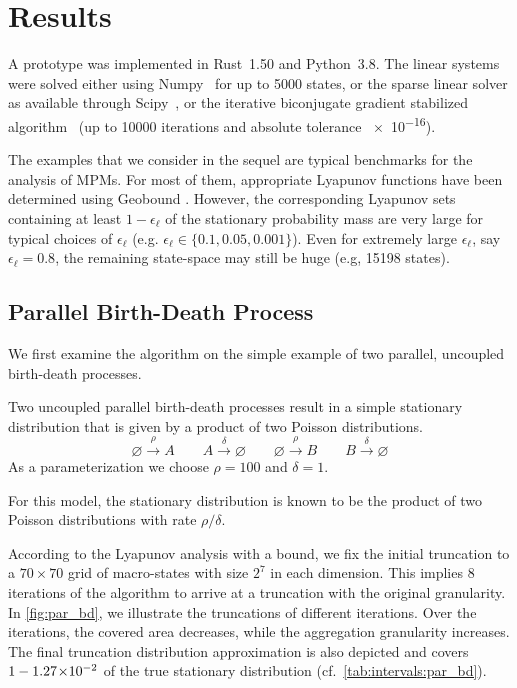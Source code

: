 \section{Results}\label{sec:statagg:results}
A prototype was implemented in Rust~1.50 and Python~3.8.
The linear systems were solved either using Numpy~\cite{numpy} for up to \num{5000} states, or the sparse linear solver as available through Scipy~\cite{2020SciPy-NMeth}, or the iterative biconjugate gradient stabilized algorithm~\cite{van1992bi} (up to \num{10000} iterations and absolute tolerance \num{e-16}).

The examples that we consider in the sequel 
are typical benchmarks for the analysis of \acp{MPM}. For most of them, appropriate Lyapunov functions
have been determined using Geobound \cite{geobound,spieler2014numerical}.
However, the corresponding Lyapunov sets containing at least $1-\epsilon_{\ell}$ of the stationary probability mass are very large for typical choices of $\epsilon_{\ell}$ (e.g. $\epsilon_{\ell}\in \{0.1,0.05,0.001\}$). Even
for extremely large $\epsilon_{\ell}$, say $\epsilon_{\ell}=0.8$, the remaining state-space may still be huge (e.g, \num{15198} states).
\subsection{Parallel Birth-Death Process}
We first examine the algorithm on the simple example of two parallel, uncoupled birth-death processes.
\begin{model}\label{model:par_bd}
Two uncoupled parallel birth-death processes result in a simple stationary distribution that is
given by a product of two Poisson distributions.
$$\varnothing\xrightarrow{\rho} A \qquad A\xrightarrow{\delta} \varnothing \qquad
\varnothing\xrightarrow{\rho} B \qquad B\xrightarrow{\delta} \varnothing$$
As a parameterization we choose $\rho = 100$ and $\delta=1$.
\end{model}
For this model, the stationary distribution is known to be the product of two Poisson distributions with rate $\rho / \delta$.

According to the Lyapunov analysis with a  bound, we fix the initial truncation to a $70\times 70$ grid of macro-states with size $2^7$ in each dimension.
This implies 8 iterations of the algorithm to arrive at a truncation with the original granularity.
In \autoref{fig:par_bd}, we illustrate the truncations of different iterations.
Over the iterations, the covered area decreases, while the aggregation granularity increases.
The final truncation distribution approximation is also depicted and covers $1 -  1.27\!\times\hspace{-.5ex} 10^{-2} $ of the true stationary distribution (cf.\ \autoref{tab:intervals:par_bd}).

